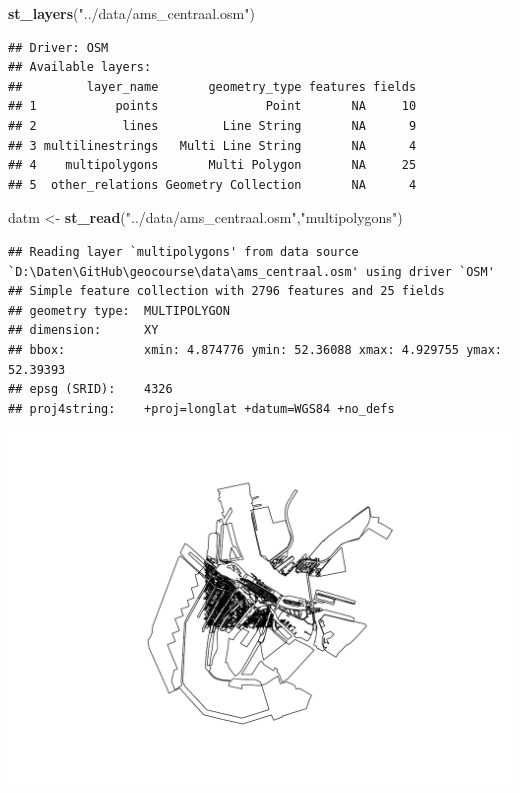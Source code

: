 \documentclass[ignorenonframetext,]{beamer}
\newenvironment{Shaded}{\begin{snugshade}}{\end{snugshade}}
\newcommand{\KeywordTok}[1]{\textcolor[rgb]{0.13,0.29,0.53}{\textbf{#1}}}
\newcommand{\StringTok}[1]{\textcolor[rgb]{0.31,0.60,0.02}{#1}}
\newcommand{\OperatorTok}[1]{\textcolor[rgb]{0.81,0.36,0.00}{\textbf{#1}}}
\newcommand{\NormalTok}[1]{#1}
\begin{document}
\begin{frame}[fragile]{}

\begin{Shaded}
\begin{Highlighting}[]
\KeywordTok{st_layers}\NormalTok{(}\StringTok{"../data/ams_centraal.osm"}\NormalTok{)}
\end{Highlighting}
\end{Shaded}

\begin{verbatim}
## Driver: OSM 
## Available layers:
##         layer_name       geometry_type features fields
## 1           points               Point       NA     10
## 2            lines         Line String       NA      9
## 3 multilinestrings   Multi Line String       NA      4
## 4    multipolygons       Multi Polygon       NA     25
## 5  other_relations Geometry Collection       NA      4
\end{verbatim}

\begin{Shaded}
\begin{Highlighting}[]
\NormalTok{datm <-}\StringTok{ }\KeywordTok{st_read}\NormalTok{(}\StringTok{"../data/ams_centraal.osm"}\NormalTok{,}\StringTok{"multipolygons"}\NormalTok{)}
\end{Highlighting}
\end{Shaded}

\begin{verbatim}
## Reading layer `multipolygons' from data source `D:\Daten\GitHub\geocourse\data\ams_centraal.osm' using driver `OSM'
## Simple feature collection with 2796 features and 25 fields
## geometry type:  MULTIPOLYGON
## dimension:      XY
## bbox:           xmin: 4.874776 ymin: 52.36088 xmax: 4.929755 ymax: 52.39393
## epsg (SRID):    4326
## proj4string:    +proj=longlat +datum=WGS84 +no_defs
\end{verbatim}

\begin{Shaded}
\end{Shaded}

\includegraphics{slides_all2gether_part2_files/figure-beamer/unnamed-chunk-82-1.pdf}


\end{frame}
\end{document}
